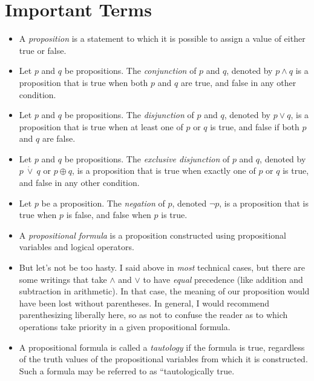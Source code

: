 \documentclass{article}
\begin{document}
\section{Important Terms}
\begin{itemize}

\item A {\it proposition} is a statement to which it is possible to assign a value of either true or false.
\item Let $p$ and $q$ be propositions. The {\it conjunction} of $p$ and $q$, denoted by $p\wedge q$ is a proposition that is true when both $p$ and $q$ are true, and false in any other condition.
\item Let $p$ and $q$ be propositions. The {\it disjunction} of $p$ and $q$, denoted by $p\vee q$, is a proposition that is true when at least one of $p$ or $q$ is true, and false if both $p$ and $q$ are false.
\item Let $p$ and $q$ be propositions. The {\it exclusive disjunction} of $p$ and $q$, denoted by $p\ \dot\vee\ q$ or $p\oplus q$, is a proposition that is true when exactly one of $p$ or $q$ is true, and false in any other condition.
\item Let $p$ be a proposition. The {\it negation} of $p$, denoted $\neg p$, is a proposition that is true when $p$ is false, and false when $p$ is true.
\item A {\it propositional formula} is a proposition constructed using propositional variables and logical operators.
\item But let's not be too hasty. I said above in {\it most} technical cases, but there are some writings that take $\wedge$ and $\vee$ to have {\it equal} precedence (like addition and subtraction in arithmetic). In that case, the meaning of our proposition would have been lost without parentheses. In general, I would recommend parenthesizing liberally here, so as not to confuse the reader as to which operations take priority in a given propositional formula.
\item A propositional formula is called a {\it tautology} if the formula is true, regardless of the truth values of the propositional variables from which it is constructed. Such a formula may be referred to as ``tautologically true.

\end{itemize}
\end{document}
